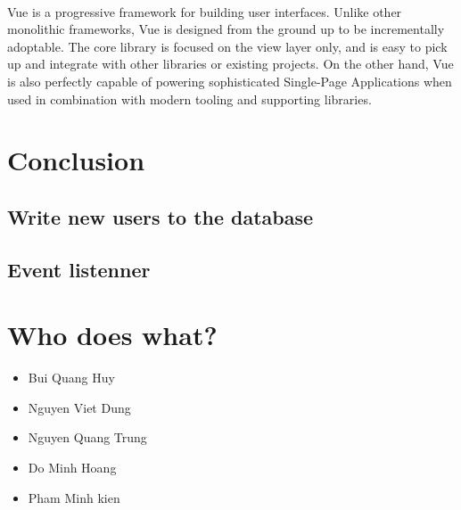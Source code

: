 \documentclass{article}
\begin{document}
\paragraph{}
Vue is a progressive framework for building user interfaces. Unlike other monolithic frameworks, Vue is designed from the ground up to be incrementally adoptable. The core library is focused on the view layer only, and is easy to pick up and integrate with other libraries or existing projects. On the other hand, Vue is also perfectly capable of powering sophisticated Single-Page Applications when used in combination with modern tooling and supporting libraries.


\section{Conclusion}
\subsection{Write new users to the database}
\subsection{Event listenner}





\section{Who does what?}

\begin{itemize}
	\item Bui Quang Huy
	\item Nguyen Viet Dung
	\item Nguyen Quang Trung
	\item Do Minh Hoang
	\item Pham Minh kien
\end{itemize}
\end{document}
